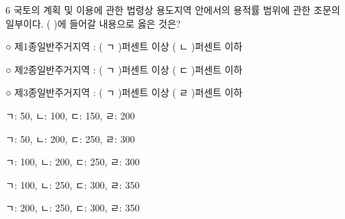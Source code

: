 \begin{question}{6}
국토의 계획 및 이용에 관한 법령상 용도지역 안에서의 용적률 범위에 관한 조문의 일부이다. ( )에 들어갈 내용으로 옳은 것은?
\begin{framedtext}
○ 제1종일반주거지역 : ( ㄱ )퍼센트 이상 ( ㄴ )퍼센트 이하 \par
○ 제2종일반주거지역 : ( ㄱ )퍼센트 이상 ( ㄷ )퍼센트 이하 \par
○ 제3종일반주거지역 : ( ㄱ )퍼센트 이상 ( ㄹ )퍼센트 이하 \par
\end{framedtext}
\begin{choices}
  \item ㄱ: 50, ㄴ: 100, ㄷ: 150, ㄹ: 200
  \item ㄱ: 50, ㄴ: 200, ㄷ: 250, ㄹ: 300
  \item ㄱ: 100, ㄴ: 200, ㄷ: 250, ㄹ: 300
  \item ㄱ: 100, ㄴ: 250, ㄷ: 300, ㄹ: 350
  \item ㄱ: 200, ㄴ: 250, ㄷ: 300, ㄹ: 350
\end{choices}
\end{question}
